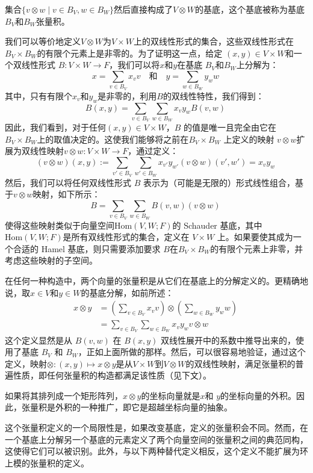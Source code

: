 集合\(\{v \otimes w \mid v \in B_V, w \in B_W\}\)然后直接构成了\( V \otimes W \)的基底，这个基底被称为基底\( B_V \)和\( B_W \)张量积。

我们可以等价地定义\( V \otimes W \)为\( V \times W \)上的双线性形式的集合，这些双线性形式在\( B_V \times B_W \)的有限个元素上是非零的。为了证明这一点，给定 \( (x, y) \in V \times W \)和一个双线性形式 \( B: V \times W \to F \)，我们可以将\( x \)和\( y \)在基底 \( B_V \)和\( B_W \)上分解为：
\[
x = \sum_{v \in B_V} x_v v \quad \text{和} \quad y = \sum_{w \in B_W} y_w w~
\]
其中，只有有限个\( x_v \)和\( y_w \)是非零的，利用\( B \)的双线性特性，我们得到：
\[
B(x, y) = \sum_{v \in B_V} \sum_{w \in B_W} x_v y_w B(v, w)~
\]
因此，我们看到，对于任何\( (x, y) \in V \times W \)，\( B \) 的值是唯一且完全由它在\( B_V \times B_W \)上的取值决定的。这使我们能够将之前在\( B_V \times B_W \) 上定义的映射 \( v \otimes w \)扩展为双线性映射\( v \otimes w: V \times W \to F \)，通过定义：
\[
(v \otimes w)(x, y) := \sum_{v' \in B_V} \sum_{w' \in B_W} x_{v'} y_{w'} (v \otimes w)(v', w') = x_v y_w~
\]
然后，我们可以将任何双线性形式 \( B \) 表示为（可能是无限的）形式线性组合，基于\( v \otimes w \)映射，如下所示：
\[
B = \sum_{v \in B_V} \sum_{w \in B_W} B(v, w) (v \otimes w)~
\]
使得这些映射类似于向量空间\( \text{Hom}(V, W; F) \)的 Schauder 基底，其中\( \text{Hom}(V, W; F) \)是所有双线性形式的集合，定义在 \( V \times W \) 上。如果要使其成为一个合适的 Hamel 基底，则只需要添加要求 \( B \)在\( B_V \times B_W \)的有限个元素上非零，并考虑这些映射的子空间。

在任何一种构造中，两个向量的张量积是从它们在基底上的分解定义的。更精确地说，取\( x \in V \)和\( y \in W \)的基底分解，如前所述：
\[
\begin{aligned}
x \otimes y &= \left( \sum_{v \in B_V} x_v v \right) \otimes \left( \sum_{w \in B_W} y_w w \right) \\
&= \sum_{v \in B_V} \sum_{w \in B_W} x_v y_w v \otimes w
\end{aligned}~
\]
这个定义显然是从 \( B(v, w) \) 在 \( B(x, y) \) 双线性展开中的系数中推导出来的，使用了基底 \( B_V \) 和 \( B_W \)，正如上面所做的那样。然后，可以很容易地验证，通过这个定义，映射\(\otimes : (x, y) \mapsto x \otimes y\)是从\( V \times W \)到\( V \otimes W \)的双线性映射，满足张量积的普遍性质，即任何张量积的构造都满足该性质（见下文）。

如果将其排列成一个矩形阵列，\( x \otimes y \)的坐标向量就是\( x \)和 \( y \)的坐标向量的外积。因此，张量积是外积的一种推广，即它是超越坐标向量的抽象。

这个张量积定义的一个局限性是，如果改变基底，定义的张量积会不同。然而，在一个基底上分解另一个基底的元素定义了两个向量空间的张量积之间的典范同构，这使得它们可以被识别。此外，与以下两种替代定义相反，这个定义不能扩展为环上模的张量积的定义。
